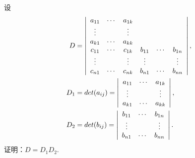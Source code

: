 \begin{li}
  设
  $$
  \begin{aligned}
    D &= \left|
      \begin{array}{cccccc}
        a_{11} & \cdots & a_{1k} &    &    &   \\
        \vdots    &     &  \vdots  &    &    &   \\
        a_{k1} & \cdots & a_{kk} &    &    &   \\
        c_{11} & \cdots & c_{1k} & b_{11}&  \cdots & b_{1n}   \\
        \vdots    &     & \vdots   & \vdots  &    & \vdots \\
        c_{n1} & \cdots & c_{nk} & b_{n1}&  \cdots & b_{nn}
      \end{array}
    \right|, \\
    D_1 &= det(a_{ij}) = \left|
      \begin{array}{ccc}
        a_{11} & \cdots & a_{1k} \\
        \vdots    &     &  \vdots  \\
        a_{k1} & \cdots & a_{kk} \\
      \end{array}
    \right|, \\
    D_2 & = det(b_{ij}) = \left|
      \begin{array}{ccc}
        b_{11} & \cdots & b_{1n} \\
        \vdots    &     &  \vdots  \\
        b_{n1} & \cdots & b_{nn} \\
      \end{array}
    \right|.
  \end{aligned}
  $$
  证明：$D=D_1D_2$.
\end{li}
